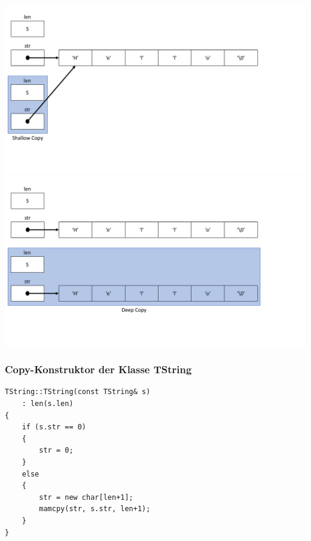\begin{multicols}{2}
\includegraphics[width=\linewidth]{images/klasse5.pdf}
\columnbreak
\includegraphics[width=\linewidth]{images/klasse6.pdf}
\end{multicols}

\subsubsection{Copy-Konstruktor der Klasse TString}
\vspace{-\baselineskip}
\begin{minipage}{0.45\linewidth}
\begin{lstlisting}
TString::TString(const TString& s)
	: len(s.len)
{
	if (s.str == 0)
	{
		str = 0;
	}
	else
	{
		str = new char[len+1];
		mamcpy(str, s.str, len+1);
	}
}
\end{lstlisting}
\end{minipage}

